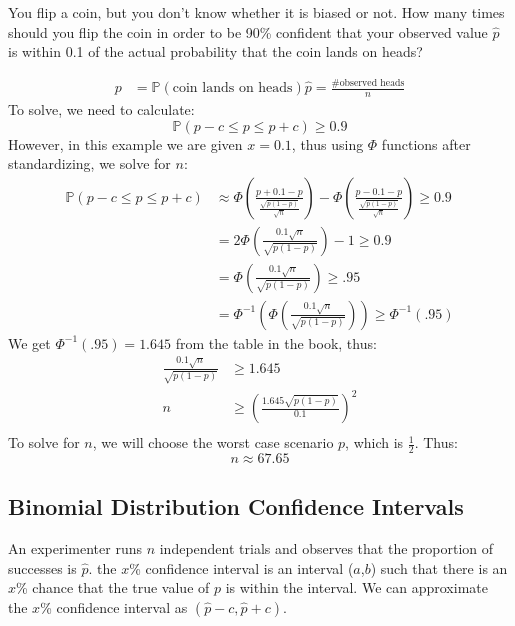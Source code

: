\documentclass[titlepage, 12pt, leqno]{article}
\begin{document}
\begin{ex}
    You flip a coin, but you don't know whether it is biased or not. How many times should you flip the coin in order to be 90\% confident that your observed value $\hat p$ is within 0.1 of the actual probability that the coin lands on heads?

   \begin{align*}
       p &= \mathbb{P}( \text{coin lands on heads}) \hat p = \frac{ \text{\# observed heads}}{n} 
   \end{align*}
   To solve, we need to calculate:
   \[
   \mathbb{P}(p-c \le p \le p+c) \ge 0.9
   \]
   However, in this example we are given $x = 0.1$, thus using $\Phi$ functions after standardizing, we solve for $n$:
  \begin{align*}
      \mathbb{P}(p-c \le p \le p+c) &\approx \Phi\left(\frac{p+0.1-p}{\frac{\sqrt{p(1-p)}}{\sqrt n}}\right) - \Phi\left(\frac{p-0.1-p}{\frac{\sqrt{p(1-p)}}{\sqrt n}}\right) \ge 0.9 \\
                                    &= 2\Phi\left(\frac{0.1\sqrt n}{\sqrt{p(1-p)}} \right) - 1 \ge 0.9 \\
                                    &= \Phi\left(\frac{0.1\sqrt n}{\sqrt{p(1-p)}}\right) \ge .95 \\
                                    &= \Phi^{-1}\left(\Phi\left(\frac{0.1\sqrt n}{\sqrt{p(1-p)}}\right)\right) \ge \Phi^{-1}(.95)
  \end{align*}
  We get $\Phi^{-1}(.95) = 1.645$ from the table in the book, thus:
 \begin{align*}
     \frac{0.1\sqrt n}{\sqrt{p(1-p)}} &\ge 1.645 \\
     n &\ge \left(\frac{1.645\sqrt{p(1-p)}}{0.1}\right)^2 \\
 \end{align*}
 To solve for $n$, we will choose the worst case scenario $p$, which is $\frac{1}{2} $. Thus:
 \[
     \boxed{n \approx 67.65} 
 \]
\end{ex}

\subsection{Binomial Distribution Confidence Intervals}
An experimenter runs $n$ independent trials and observes that the proportion of successes is $\hat p$. the $x$\% confidence interval is an interval ($a$,$b$) such that there is an $x$\% chance that the true value of $p$ is within the interval. We can approximate the $x$\% confidence interval as $(\hat p - c, \hat p + c)$.
\end{document}
